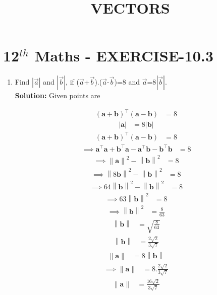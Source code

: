 \documentclass[10pt]{article}
\newcommand{\solution}{\noindent \textbf{Solution: }}
\providecommand{\norm}[1]{\left\lVert#1\right\rVert}
\providecommand{\abs}[1]{\left\vert#1\right\vert}
\let\vec\mathbf{}
\begin{document}
\begin{center}
\title{\textbf{VECTORS}}
\date{\vspace{-5ex}} %
\maketitle
\end{center}

\section{12$^{th}$ Maths - EXERCISE-10.3}

\begin{enumerate}
\item Find $\abs{\overrightarrow{a}}$ and $\abs{\overrightarrow{b}}$, if ($\overrightarrow{a}$+$\overrightarrow{b}$)$.$($\overrightarrow{a}$-$\overrightarrow{b}$)=8 and ${\overrightarrow{a}}$=8$\abs{\overrightarrow{b}}$.\\  

\solution
Given  points are

\begin{align}
(\vec{a}+\vec{b})^{\top}(\vec{a}-\vec{b})&=8
\end{align}
\begin{align}
\abs{\vec{a}}&=8\abs{\vec{b}}
\end{align}
\begin{align}
(\vec{a}+\vec{b})^{\top}(\vec{a}-\vec{b})&=8
\end{align}
\begin{align}
\implies\vec{a}^{\top}\vec{a}+\vec{b}^{\top}\vec{a}-\vec{a}^{\top}\vec{b}-\vec{b}^{\top}\vec{b}&=8
\end{align}
\begin{align}
\implies\norm{\vec{a}}^2-\norm{\vec{b}}^2&=8
\end{align}
\begin{align}
\implies\norm{8\vec{b}}^2-\norm{\vec{b}}^2&=8
\end{align}
\begin{align}
\implies64{\norm{\vec{b}}}^2-\norm{\vec{b}}^2&=8
\end{align}
\begin{align}
\implies63{\norm{\vec{b}}}^2&=8
\end{align}
\begin{align}
\implies\norm{\vec{b}}^2&=\frac{8}{63}
\end{align}
\begin{align}
\norm{\vec{b}}&=\sqrt{\frac{8}{63}}
\end{align}
\begin{align}
\norm{\vec{b}}&=\frac{2\sqrt{2}}{3\sqrt{7}}
\end{align}
\begin{align}
\norm{\vec{a}}&=8\norm{\vec{b}}
\end{align}
\begin{align}
\implies\norm{\vec{a}}&=8.\frac{2\sqrt{2}}{3\sqrt{7}}
\end{align}
\begin{align}
\norm{\vec{a}}&=\frac{16\sqrt{2}}{3\sqrt{7}}
\end{align}
\end{enumerate}
\end{document}
